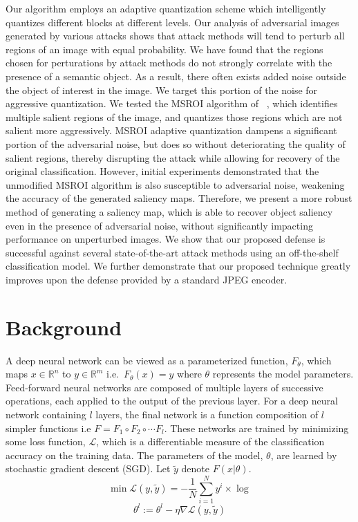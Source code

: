 Our algorithm employs an adaptive quantization scheme which intelligently quantizes different blocks at different levels. 
Our analysis of adversarial images generated by various attacks shows that attack methods will tend to perturb all regions of an image with equal probability. 
We have found that the regions chosen for perturations by attack methods do not strongly correlate with the presence of a semantic object.
As a result, there often exists added noise outside the object of interest in the image. We target this portion of the noise for aggressive quantization.
We tested the MSROI algorithm of  ~\cite{Prakash2017SemanticPI}, which identifies multiple salient regions of the image, and quantizes those regions which are not salient more aggressively. %
MSROI adaptive quantization dampens a significant portion of the adversarial noise, but does so without deteriorating the quality of salient regions, thereby disrupting the attack while allowing for recovery of the original classification.
However, initial experiments demonstrated that the unmodified MSROI algorithm is also susceptible to adversarial noise, weakening the accuracy of the generated saliency maps.
Therefore, we present a more robust method of generating a saliency map, which is able to recover object saliency even in the presence of adversarial noise, without significantly impacting performance on unperturbed images.
We show that our proposed defense is successful against several state-of-the-art attack methods using an off-the-shelf classification model.
We further demonstrate that our proposed technique greatly improves upon the defense provided by a standard JPEG encoder.

\section{Background}
A deep neural network can be viewed as a parameterized function, $F_\theta$, which maps $x \in \mathbb{R}^n$ to $y \in \mathbb{R}^m$  i.e.\ $F_\theta(x) = y$ where $\theta$ represents the model parameters. 
Feed-forward neural networks are composed of multiple layers of successive operations, each applied to the output of the previous layer. For a deep neural network containing $l$ layers, the final network is a function composition of $l$ simpler functions i.e $F = F_1 \circ F_2 \circ \cdots F_l$.
These networks are trained by minimizing some loss function, $\mathcal{L}$, which is a differentiable measure of the classification accuracy on the training data.
The parameters of the model, $\theta$, are learned by stochastic gradient descent (SGD). 
Let $\widetilde{y}$ denote $F(x|\theta)$.
\[
   \min \mathcal{L}(y, \widetilde{y}) = - \frac{1}{N} \sum_{i=1}^N y^i \times \log %
\]
\[
   \theta^l := \theta^l - \eta \nabla \mathcal{L}(y,\widetilde{y})
\]


